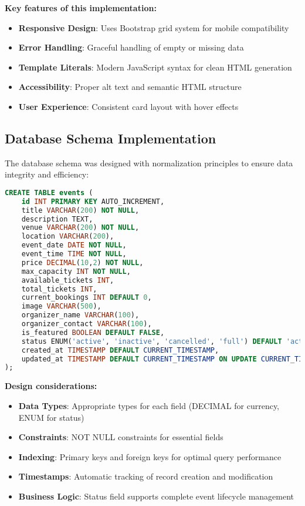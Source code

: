 \documentclass[12pt,a4paper]{article}
\begin{document}
\textbf{Key features of this implementation:}
\begin{itemize}
    \item \textbf{Responsive Design}: Uses Bootstrap grid system for mobile compatibility
    \item \textbf{Error Handling}: Graceful handling of empty or missing data
    \item \textbf{Template Literals}: Modern JavaScript syntax for clean HTML generation
    \item \textbf{Accessibility}: Proper alt text and semantic HTML structure
    \item \textbf{User Experience}: Consistent card layout with hover effects
\end{itemize}

\subsection{Database Schema Implementation}

The database schema was designed with normalization principles to ensure data integrity and efficiency:

\begin{lstlisting}[language=sql, caption=Core Events Table Structure]
CREATE TABLE events (
    id INT PRIMARY KEY AUTO_INCREMENT,
    title VARCHAR(200) NOT NULL,
    description TEXT,
    venue VARCHAR(200) NOT NULL,
    location VARCHAR(200),
    event_date DATE NOT NULL,
    event_time TIME NOT NULL,
    price DECIMAL(10,2) NOT NULL,
    max_capacity INT NOT NULL,
    available_tickets INT,
    total_tickets INT,
    current_bookings INT DEFAULT 0,
    image VARCHAR(500),
    organizer_name VARCHAR(100),
    organizer_contact VARCHAR(100),
    is_featured BOOLEAN DEFAULT FALSE,
    status ENUM('active', 'inactive', 'cancelled', 'full') DEFAULT 'active',
    created_at TIMESTAMP DEFAULT CURRENT_TIMESTAMP,
    updated_at TIMESTAMP DEFAULT CURRENT_TIMESTAMP ON UPDATE CURRENT_TIMESTAMP
);
\end{lstlisting}

\textbf{Design considerations:}
\begin{itemize}
    \item \textbf{Data Types}: Appropriate types for each field (DECIMAL for currency, ENUM for status)
    \item \textbf{Constraints}: NOT NULL constraints for essential fields
    \item \textbf{Indexing}: Primary keys and foreign keys for optimal query performance
    \item \textbf{Timestamps}: Automatic tracking of record creation and modification
    \item \textbf{Business Logic}: Status field supports complete event lifecycle management
\end{itemize}
\end{document}
